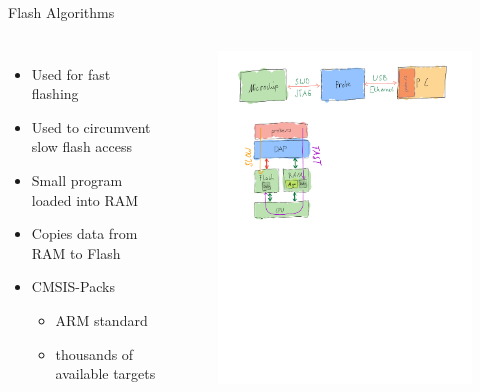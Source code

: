 \documentclass[aspectratio=1610,14pt,t]{beamer}
\begin{document}
\begin{frame}[c,fragile]{Flash Algorithms}
  \begin{columns}[t,onlytextwidth]
    \begin{itemize}
      \item Used for fast flashing
      \item Used to circumvent slow flash access
      \item Small program loaded into RAM
      \item Copies data from RAM to Flash
      \item CMSIS-Packs
      \begin{itemize}
        \item ARM standard
        \item thousands of available targets
      \end{itemize}
    \end{itemize}
    \begin{figure}
      \includegraphics[trim=2cm 13cm 0 6cm, clip, width=12cm]{./img/probe-chain.pdf}
    \end{figure}
  \end{columns}
\end{frame}
\end{document}
